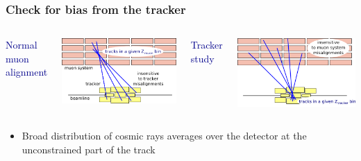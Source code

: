 \documentclass[compress]{beamer}
\begin{document}
\begin{frame}
\frametitle{Check for bias from the tracker}

\vspace{0.25 cm}
\begin{columns}
\textcolor{darkblue}{Normal muon alignment}

\includegraphics[width=\linewidth]{globalMuons_vsmuon.png}

\textcolor{darkblue}{Tracker study}

\includegraphics[width=\linewidth]{globalMuons_vstracker.png}
\end{columns}

\begin{itemize}
\item Broad distribution of cosmic rays averages over the detector at the unconstrained part of the track
\end{itemize}


\end{frame}
\end{document}
